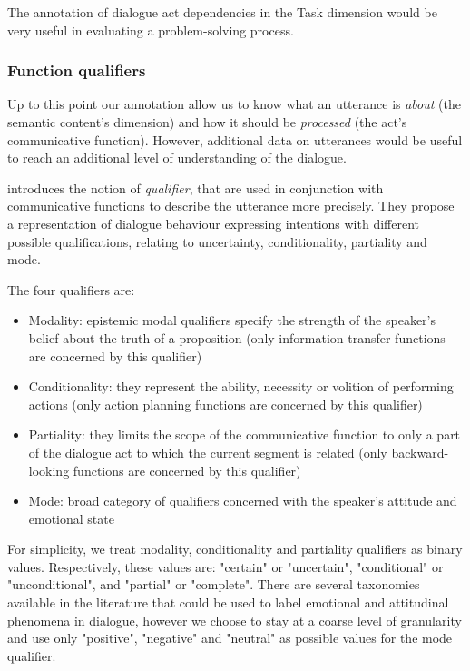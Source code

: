 The annotation of dialogue act dependencies in the Task dimension would be very useful in evaluating a problem-solving process.

\subsubsection{Function qualifiers}

Up to this point our annotation allow us to know what an utterance is \textit{about} (the semantic content's dimension) and how it should be \textit{processed} (the act's communicative function). However, additional data on utterances would be useful to reach an additional level of understanding of the dialogue. 

\cite{petukhova2010introducing} introduces the notion of \textit{qualifier}, that are used in conjunction with communicative functions to describe the utterance more precisely. They propose a representation of dialogue behaviour expressing intentions with different possible qualifications, relating to uncertainty, conditionality, partiality and mode.

The four qualifiers are:

\begin{itemize}
	\item Modality: epistemic modal qualifiers specify the strength of the speaker's belief about the truth of a proposition (only information transfer functions are concerned by this qualifier)
	\item Conditionality: they represent the ability, necessity or volition of performing actions (only action planning functions are concerned by this qualifier)
	\item Partiality: they limits the scope of the communicative function to only a part of the dialogue act to which the current segment is related (only backward-looking functions are concerned by this qualifier)
	\item Mode: broad category of qualifiers concerned with the speaker's attitude and emotional state
\end{itemize}

For simplicity, we treat modality, conditionality and partiality qualifiers as binary values. Respectively, these values are: "certain" or "uncertain", "conditional" or "unconditional", and "partial" or "complete". There are several taxonomies available in the literature that could be used to label emotional and attitudinal phenomena in dialogue, however we choose to stay at a coarse level of granularity and use only "positive", "negative" and "neutral" as possible values for the mode qualifier.

